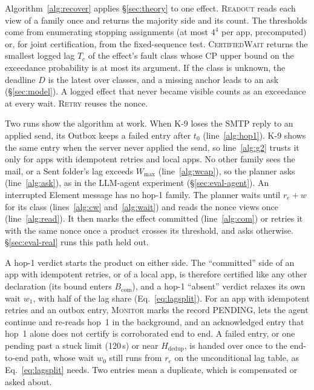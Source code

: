 Algorithm~\ref{alg:recover} applies \S\ref{sec:theory} to one effect. \textsc{Readout} reads each view of a family once and returns the majority side and its count.
The thresholds come from enumerating stopping assignments (at most $4^4$ per app, precomputed) or, for joint certification, from the fixed-sequence test. \textsc{CertifiedWait} returns
the smallest logged lag $T_c$ of the effect's fault class whose CP upper bound on the exceedance probability is at most its argument. If the class is unknown, the
deadline $D$ is the latest over classes, and a missing anchor leads to an ask (\S\ref{sec:model}). A logged effect that never became visible counts as an exceedance at every wait. \textsc{Retry} reuses the nonce.

Two runs show the algorithm at work. When K-9 loses the SMTP reply to an applied send, its Outbox keeps a failed entry after $t_0$ (line~\ref{alg:hop1}). K-9 shows the same
entry when the server never applied the send, so line~\ref{alg:g2} trusts it only for apps with idempotent retries and local apps. No other family sees the mail, or a Sent
folder's lag exceeds $W_{\max}$ (line~\ref{alg:wcap}), so the planner asks (line~\ref{alg:ask}), as in the LLM-agent experiment (\S\ref{sec:eval-agent}). An interrupted
Element message has no hop-1 family. The planner waits until $r_e+w$ for its class (lines~\ref{alg:cw} and~\ref{alg:wait}) and reads the nonce views once (line~\ref{alg:read}).
It then marks the effect committed (line~\ref{alg:com}) or retries it with the same nonce once a product crosses its threshold, and asks otherwise. \S\ref{sec:eval-real} runs this path held out.

A hop-1 verdict starts the product on either side. The ``committed'' side of an app with idempotent retries, or of a local app, is therefore certified like any other declaration
(its bound enters $B_{\mathrm{com}}$), and a hop-1 ``absent'' verdict relaxes its own wait $w_1$, with half of the lag share (Eq.~\eqref{eq:lagsplit}). For an app with idempotent retries and an outbox entry,
\textsc{Monitor} marks the record \textsf{PENDING}, lets the agent continue and re-reads hop~1 in the background, and an acknowledged entry that hop~1 alone does not certify is corroborated end to end.
A failed entry, or one pending past a stuck limit (120\,s) or near $H_{\mathrm{dedup}}$, is handed over once to the end-to-end path, whose wait $w_0$ still runs from $r_e$ on the unconditional lag table, as Eq.~\eqref{eq:lagsplit} needs. Two entries mean a duplicate, which is compensated or asked about.

